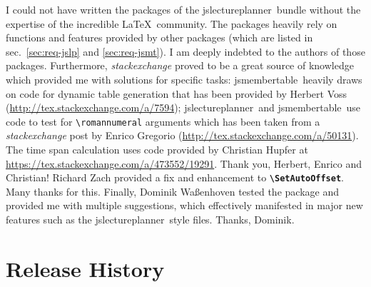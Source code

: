 \documentclass[english]{article}
\newcommand*\jmacro[1]{\textbf{\texttt{#1}}}
\newcommand*\jcsmacro[1]{\jmacro{\textbackslash{#1}}}
\newcommand*\jfmacro[1]{\texttt{#1}}
\newcommand*\jfcsmacro[1]{\jfmacro{\textbackslash{#1}}}
\newcommand*\jslp{\textsf{jslectureplanner}}
\newcommand*\jsmt{\textsf{jsmembertable}}
\begin{document}
I could not have written the packages of the \jslp\ bundle without the expertise of the incredible \LaTeX\
community. The packages heavily rely on functions and features
provided by other packages (which are listed in sec.~\ref{sec:req-jslp} and \ref{sec:req-jsmt}).
I am deeply indebted to the authors of those packages.
Furthermore, \emph{stackexchange} proved to be a great source of knowledge which
provided me with solutions for specific tasks:
\jsmt\ heavily draws on code for dynamic table generation that has been
provided by Herbert Voss (\url{http://tex.stackexchange.com/a/7594}); \jslp\ and \jsmt\
use code to test for \jfcsmacro{romannumeral} arguments which has been taken from
a \emph{stackexchange} post by Enrico Gregorio (\url{http://tex.stackexchange.com/a/50131}).
The time span calculation uses code provided by Christian Hupfer at
\url{https://tex.stackexchange.com/a/473552/19291}.
Thank you, Herbert, Enrico and Christian!
Richard Zach provided a fix and enhancement to \jcsmacro{SetAutoOffset}. Many thanks for this.
Finally, Dominik Waßenhoven tested the package and provided
me with multiple suggestions, which effectively manifested in major new features such as
the \jslp\ style files. Thanks, Dominik.

\section{Release History}
\end{document}
